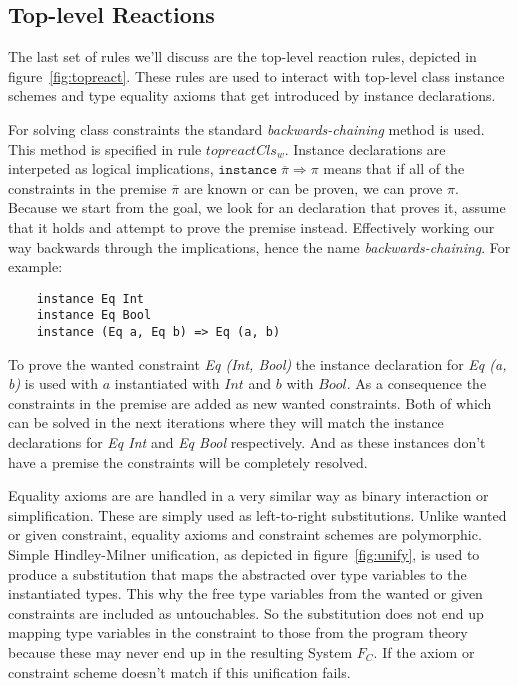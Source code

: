 \subsection{Top-level Reactions}
The last set of rules we'll discuss are the top-level reaction rules, depicted
in figure~\ref{fig:topreact}. These rules are used to interact with top-level
class instance schemes and type equality axioms that get introduced by instance
declarations.

For solving class constraints the standard \textit{backwards-chaining} method is
used. This method is specified in rule $topreactCls_w$. Instance declarations
are interpeted as logical implications, $\texttt{instance} \; \overline{\pi}
\Rightarrow \pi$ means that if all of the constraints in the premise
$\overline{\pi}$ are known or can be proven, we can prove $\pi$. Because we
start from the goal, we look for an declaration that proves it, assume that it
holds and attempt to prove the premise instead. Effectively working our way
backwards through the implications, hence the name \textit{backwards-chaining}.
For example:
\begin{verbatim}
    instance Eq Int
    instance Eq Bool
    instance (Eq a, Eq b) => Eq (a, b)
\end{verbatim}
To prove the wanted constraint \textit{Eq (Int, Bool)} the instance declaration
for \textit{Eq (a, b)} is used with $a$ instantiated with $Int$ and $b$ with
$Bool$. As a consequence the constraints in the premise are added as new wanted
constraints. Both of which can be solved in the next iterations where they will
match the instance declarations for \textit{Eq Int} and \textit{Eq Bool}
respectively. And as these instances don't have a premise the constraints will
be completely resolved.

Equality axioms are are handled in a very similar way as binary interaction or
simplification. These are simply used as left-to-right substitutions. Unlike
wanted or given constraint, equality axioms and constraint schemes are
polymorphic. Simple Hindley-Milner unification, as depicted in
figure~\ref{fig:unify}, is used to produce a substitution that maps the
abstracted over type variables to the instantiated types. This why the free type
variables from the wanted or given constraints are included as untouchables. So
the substitution does not end up mapping type variables in the constraint to
those from the program theory because these may never end up in the resulting
System $F_C$. If the axiom or constraint scheme doesn't match if this
unification fails.

